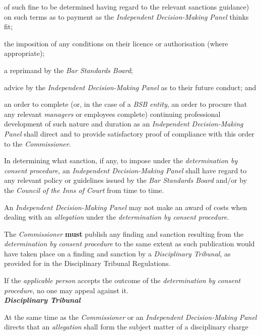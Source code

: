 of such fine to be determined having regard to the relevant sanctions
guidance) on such terms as to payment as the \emph{Independent
Decision-Making Panel} thinks fit;\item the imposition of any conditions on their licence or authorisation
(where appropriate);\item a reprimand by the \emph{Bar Standards Board};\item advice by the \emph{Independent Decision-Making Panel} as to their
future conduct; and\item an order to complete (or, in the case of a \emph{BSB entity}, an
order to procure that any relevant \emph{managers} or employees
complete) continuing professional development of such nature and
duration as an \emph{Independent Decision-Making Panel }shall direct and
to provide satisfactory proof of compliance with this order to
the \emph{Commissioner}.\ln
{}\par
In determining what sanction, if any, to impose under
the \emph{determination by consent procedure,} an \emph{Independent
Decision-Making Panel }shall have regard to any relevant policy or
guidelines issued by the \emph{Bar Standards Board} and/or by
the \emph{Council of the Inns of Court} from time to time.\\
\par
An \emph{Independent Decision-Making Panel }may not make an award of
costs when dealing with an \emph{allegation} under
the \emph{determination by consent procedure}.\\
\par
The \emph{Commissioner}  \textcolor{myred}{\textbf{must}} publish any finding and sanction resulting
from the \emph{determination by consent procedure} to the same extent as
such publication would have taken place on a finding and sanction by
a \emph{Disciplinary Tribunal}, as provided for in the Disciplinary
Tribunal Regulations.\\
\par
If the \emph{applicable person} accepts the outcome of
the \emph{determination by consent procedure}, no one may appeal against
it.\\
\textbf{\emph{Disciplinary Tribunal}}\par
{}\par
At the same time as the \emph{Commissioner }or an \emph{Independent
Decision-Making Panel }directs that an \emph{allegation} shall form the
subject matter of a disciplinary charge
